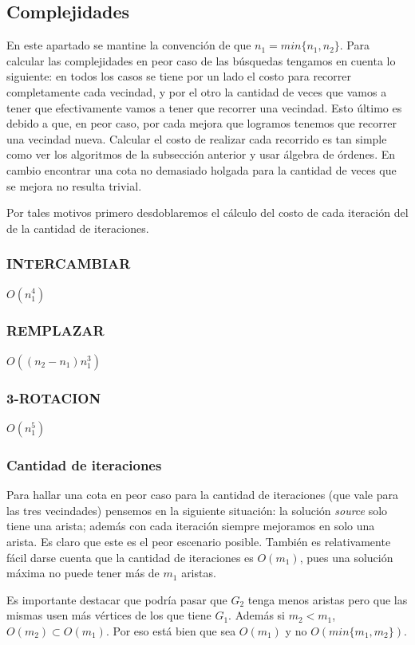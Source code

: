\subsection{Complejidades}
En este apartado se mantine la convención de que $n_1 = min\{n_1, n_2\}$.
Para calcular las complejidades en peor caso de las búsquedas tengamos en cuenta lo siguiente: en todos los casos se tiene por un lado el costo para recorrer completamente cada vecindad, y por el otro la cantidad de veces que vamos a tener que efectivamente vamos a tener que recorrer una vecindad. Esto último es debido a que, en peor caso, por cada mejora que logramos tenemos que recorrer una vecindad nueva. Calcular el costo de realizar cada recorrido es tan simple como ver los algoritmos de la subsección anterior y usar álgebra de órdenes. En cambio encontrar una cota no demasiado holgada para la cantidad de veces que se mejora no resulta trivial.

Por tales motivos primero desdoblaremos el cálculo del costo de cada iteración del de la cantidad de iteraciones.

\subsubsection{INTERCAMBIAR}
$O(n_1^4)$

\subsubsection{REMPLAZAR}
$O((n_2-n_1) n_1^3)$

\subsubsection{3-ROTACION}
$O(n_1^5)$

\subsubsection{Cantidad de iteraciones}
Para hallar una cota en peor caso para la cantidad de iteraciones (que vale para las tres vecindades) pensemos en la siguiente situación: la solución \emph{source} solo tiene una arista; además con cada iteración siempre mejoramos en solo una arista. Es claro que este es el peor escenario posible. También es relativamente fácil darse cuenta que la cantidad de iteraciones es $O(m_1)$, pues una solución máxima no puede tener más de $m_1$ aristas.

Es importante destacar que podría pasar que $G_2$ tenga menos aristas pero que las mismas usen más vértices de los que tiene $G_1$. Además si $m_2 < m_1$, $O(m_2) \subset O(m_1)$. Por eso está bien que sea $O(m_1)$ y no $O(min\{m_1, m_2\})$.


